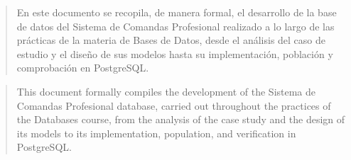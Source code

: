 \newpage
\begin{abstract}

    En este documento se recopila, de manera formal, el desarrollo de la base de datos del Sistema de Comandas Profesional realizado a lo largo de las prácticas de la materia de Bases de Datos, desde el análisis del caso de estudio y el diseño de sus modelos hasta su implementación, población y comprobación en PostgreSQL.

\end{abstract}

{
\renewcommand{\abstractname}{Abstract}
\begin{abstract}

    This document formally compiles the development of the Sistema de Comandas Profesional database, carried out throughout the practices of the Databases course, from the analysis of the case study and the design of its models to its implementation, population, and verification in PostgreSQL.

\end{abstract}
}
\thispagestyle{empty}
